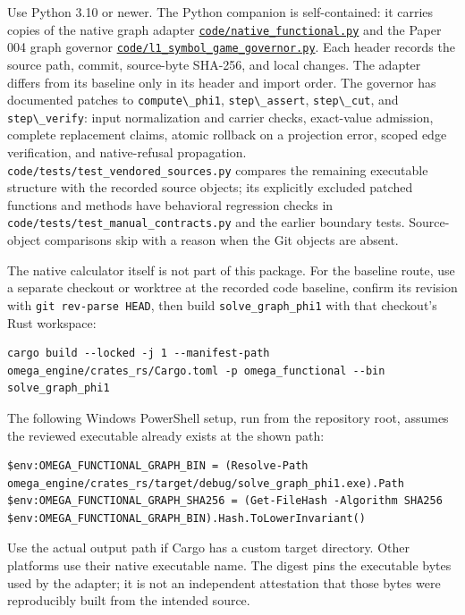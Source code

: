 \documentclass[
  11pt,
]{article}
\newcommand{\passthrough}[1]{#1}
\begin{document}
Use Python 3.10 or newer. The Python companion is self-contained: it
carries copies of the native graph adapter
\href{code/native_functional.py}{\nolinkurl{code/native_functional.py}}
and the Paper 004 graph governor
\href{code/l1_symbol_game_governor.py}{\nolinkurl{code/l1_symbol_game_governor.py}}.
Each header records the source path, commit, source-byte SHA-256, and
local changes. The adapter differs from its baseline only in its header
and import order. The governor has documented patches to
\passthrough{\lstinline!compute\_phi1!},
\passthrough{\lstinline!step\_assert!},
\passthrough{\lstinline!step\_cut!}, and
\passthrough{\lstinline!step\_verify!}: input normalization and carrier
checks, exact-value admission, complete replacement claims, atomic
rollback on a projection error, scoped edge verification, and
native-refusal propagation.
\nolinkurl{code/tests/test_vendored_sources.py} compares the remaining
executable structure with the recorded source objects; its explicitly
excluded patched functions and methods have behavioral regression checks
in \nolinkurl{code/tests/test_manual_contracts.py} and the earlier
boundary tests. Source-object comparisons skip with a reason when the
Git objects are absent.

The native calculator itself is not part of this package. For the
baseline route, use a separate checkout or worktree at the recorded code
baseline, confirm its revision with
\passthrough{\lstinline!git rev-parse HEAD!}, then build
\nolinkurl{solve_graph_phi1} with that checkout's Rust workspace:

\begin{lstlisting}
cargo build --locked -j 1 --manifest-path omega_engine/crates_rs/Cargo.toml -p omega_functional --bin solve_graph_phi1
\end{lstlisting}

The following Windows PowerShell setup, run from the repository root,
assumes the reviewed executable already exists at the shown path:

\begin{lstlisting}
$env:OMEGA_FUNCTIONAL_GRAPH_BIN = (Resolve-Path omega_engine/crates_rs/target/debug/solve_graph_phi1.exe).Path
$env:OMEGA_FUNCTIONAL_GRAPH_SHA256 = (Get-FileHash -Algorithm SHA256 $env:OMEGA_FUNCTIONAL_GRAPH_BIN).Hash.ToLowerInvariant()
\end{lstlisting}

Use the actual output path if Cargo has a custom target directory. Other
platforms use their native executable name. The digest pins the
executable bytes used by the adapter; it is not an independent
attestation that those bytes were reproducibly built from the intended
source.
\end{document}
